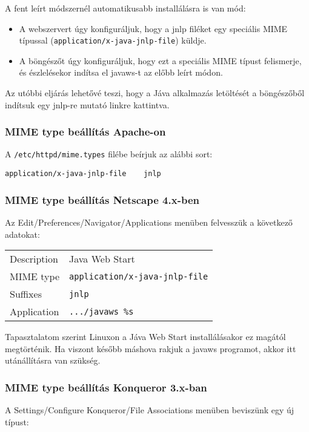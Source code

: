 A fent leírt módszernél automatikusabb installálásra is van mód:
\begin{itemize}
\item
    A webszervert úgy konfiguráljuk, hogy a jnlp filéket
    egy speciális MIME típussal 
    (\verb!application/x-java-jnlp-file!) küldje.
\item
    A böngészőt úgy konfiguráljuk, hogy ezt a speciális 
    MIME típust felismerje, és észlelésekor indítsa el
    javaws-t az előbb leírt módon.
\end{itemize}

Az utóbbi eljárás lehetővé teszi, hogy a Jáva alkalmazás
letöltését a böngészőből indítsuk egy jnlp-re mutató linkre
kattintva.

\subsubsection*{MIME type beállítás Apache-on}
A \verb!/etc/httpd/mime.types! filébe beírjuk az alábbi sort:
\begin{verbatim}
application/x-java-jnlp-file    jnlp
\end{verbatim}
 
\subsubsection*{MIME type beállítás Netscape 4.x-ben}
Az Edit/Preferences/Navigator/Applications menüben  felvesszük 
a következő adatokat:

\begin{tabular}{l@{~:~~~}l}
Description  & Java Web Start                           \\
MIME type    & \verb!application/x-java-jnlp-file!      \\
Suffixes     & \verb!jnlp!                              \\
Application  & \verb!.../javaws %s!                     \\
\end{tabular}

Tapasztalatom szerint Linuxon a Jáva Web Start installálásakor
ez magától megtörténik. Ha viszont később máshova rakjuk
a javaws programot, akkor itt utánállításra van szükség. 

\subsubsection*{MIME type beállítás Konqueror 3.x-ban}

A Settings/Configure Konqueror/File Associations menüben 
beviszünk egy új típust:

